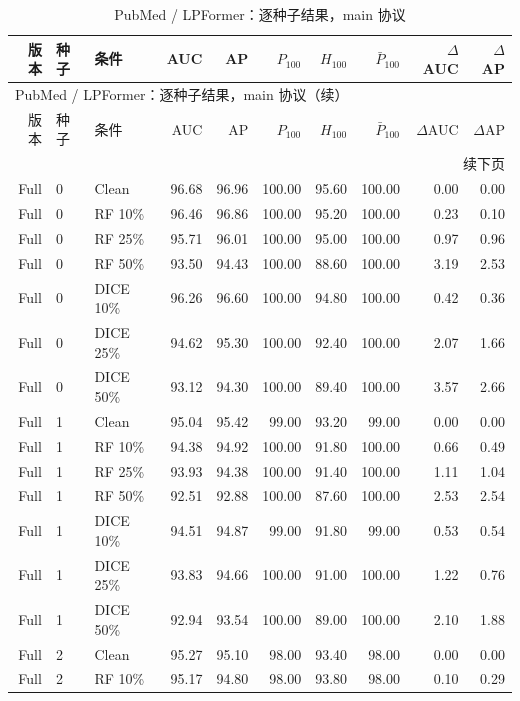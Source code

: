 {\footnotesize
\setlength{\tabcolsep}{3.2pt}
\renewcommand{\arraystretch}{1.10}
\begin{longtable}{rllrrrrrrr}
\caption{PubMed / LPFormer：逐种子结果，main 协议}\\
\toprule
版本 & 种子 & 条件 & AUC & AP & $P_{100}$ & $H_{100}$ & $\bar P_{100}$ & $\Delta$AUC & $\Delta$AP \\
\midrule
\endfirsthead
\multicolumn{10}{l}{PubMed / LPFormer：逐种子结果，main 协议（续）}\\
\toprule
版本 & 种子 & 条件 & AUC & AP & $P_{100}$ & $H_{100}$ & $\bar P_{100}$ & $\Delta$AUC & $\Delta$AP \\
\midrule
\endhead
\midrule\multicolumn{10}{r}{续下页}\\
\endfoot
\bottomrule
\endlastfoot
Full & 0 & Clean & 96.68 & 96.96 & 100.00 & 95.60 & 100.00 & 0.00 & 0.00 \\
Full & 0 & RF 10\% & 96.46 & 96.86 & 100.00 & 95.20 & 100.00 & 0.23 & 0.10 \\
Full & 0 & RF 25\% & 95.71 & 96.01 & 100.00 & 95.00 & 100.00 & 0.97 & 0.96 \\
Full & 0 & RF 50\% & 93.50 & 94.43 & 100.00 & 88.60 & 100.00 & 3.19 & 2.53 \\
Full & 0 & DICE 10\% & 96.26 & 96.60 & 100.00 & 94.80 & 100.00 & 0.42 & 0.36 \\
Full & 0 & DICE 25\% & 94.62 & 95.30 & 100.00 & 92.40 & 100.00 & 2.07 & 1.66 \\
Full & 0 & DICE 50\% & 93.12 & 94.30 & 100.00 & 89.40 & 100.00 & 3.57 & 2.66 \\
Full & 1 & Clean & 95.04 & 95.42 & 99.00 & 93.20 & 99.00 & 0.00 & 0.00 \\
Full & 1 & RF 10\% & 94.38 & 94.92 & 100.00 & 91.80 & 100.00 & 0.66 & 0.49 \\
Full & 1 & RF 25\% & 93.93 & 94.38 & 100.00 & 91.40 & 100.00 & 1.11 & 1.04 \\
Full & 1 & RF 50\% & 92.51 & 92.88 & 100.00 & 87.60 & 100.00 & 2.53 & 2.54 \\
Full & 1 & DICE 10\% & 94.51 & 94.87 & 99.00 & 91.80 & 99.00 & 0.53 & 0.54 \\
Full & 1 & DICE 25\% & 93.83 & 94.66 & 100.00 & 91.00 & 100.00 & 1.22 & 0.76 \\
Full & 1 & DICE 50\% & 92.94 & 93.54 & 100.00 & 89.00 & 100.00 & 2.10 & 1.88 \\
Full & 2 & Clean & 95.27 & 95.10 & 98.00 & 93.40 & 98.00 & 0.00 & 0.00 \\
Full & 2 & RF 10\% & 95.17 & 94.80 & 98.00 & 93.80 & 98.00 & 0.10 & 0.29 \\

\end{longtable}}
